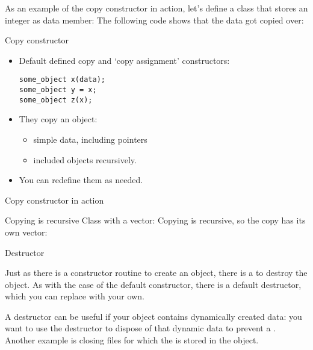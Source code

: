 As an example of the copy constructor in action,
let's define a class that stores an integer as data member:
%
%
The following code shows that the data got copied over:
%

\begin{slide}{Copy constructor}
  \label{sl:class-copy}
  \begin{multicols}{2}
    \begin{itemize}
    \item  Default defined copy and `copy assignment' constructors:
\begin{lstlisting}
some_object x(data);
some_object y = x;
some_object z(x);
\end{lstlisting}
    \item They copy an object:
      \begin{itemize}
      \item simple data, including pointers
      \item included objects recursively.
      \end{itemize}
    \item You can redefine them as needed.
    \end{itemize}
    \vfill\columnbreak
  \lstset{style=snippetcode}
  \end{multicols}
\end{slide}

\begin{slide}{Copy constructor in action}
  \label{sl:class-copy-out}
\end{slide}

\begin{block}{Copying is recursive}
  \label{sl:class-copy-vector}
  Class with a vector:
  \lstset{style=snippetcode}
  Copying is recursive, so the copy has its own vector:
\end{block}

 {Destructor}
\label{sec:destructor}

Just as there is a constructor routine to create an object, there is a
 to destroy the object.
As with the case of the default constructor, there is a default
destructor, which you can replace with your own.

A destructor can be useful if your object contains dynamically created
data: you want to use the destructor to dispose of that dynamic data
to prevent a . Another example is closing
files for which the  is stored in the object.

